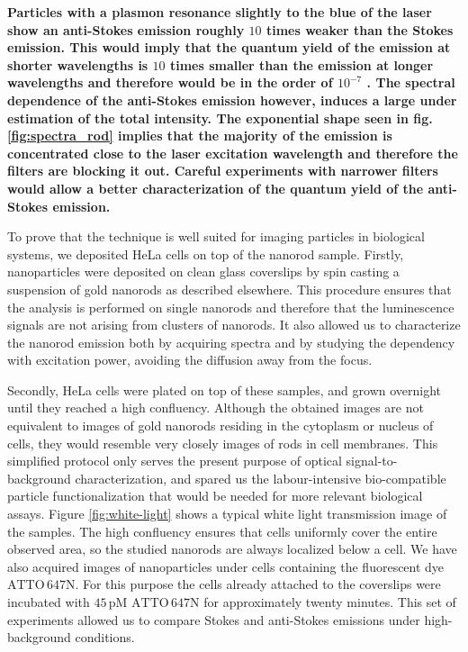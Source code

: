 \documentclass[journal=nalefd,manuscript=letter]{achemso}
\newcommand{\pM}{\ensuremath{\,\textrm{pM}}}
\newcommand{\atto}{\ensuremath{\textrm{ATTO}\,647\textrm{N}}}
\begin{document}
\textbf{Particles with a plasmon resonance slightly to the blue of the laser
show an anti-Stokes emission roughly $10$ times weaker than the Stokes emission.
This would imply that the quantum yield of the emission at shorter wavelengths
is $10$ times smaller than the emission at longer wavelengths and therefore
would be in the order of $10^{-7}$
\cite{Yorulmaz2012,Cheng2015,Rao2015,Fang2012}. The spectral dependence of the
anti-Stokes emission however, induces a large under estimation of the total
intensity. The exponential shape seen in fig. \ref{fig:spectra_rod} implies that
the majority of the emission is concentrated close to the laser excitation
wavelength and therefore the filters are blocking it out. Careful experiments
with narrower filters would allow a better characterization of the quantum
yield of the anti-Stokes emission.}

To prove that the technique is well suited for imaging particles in
biological systems, we deposited HeLa cells on top of the nanorod sample.
Firstly, nanoparticles were deposited on clean glass coverslips by spin casting
a suspension of gold nanorods as described elsewhere\cite{Zijlstra2011}. This
procedure ensures that the analysis is performed on single nanorods and
therefore that the luminescence signals are not arising from clusters of
nanorods. It also allowed us to characterize the nanorod emission both by
acquiring spectra and by studying the dependency with excitation power, avoiding
the diffusion away from the focus.

Secondly, HeLa cells were plated on top of these samples, and grown overnight
until they reached a high confluency. Although the obtained images are not
equivalent to images of gold nanorods residing in the cytoplasm or nucleus of
cells, they would resemble very closely images of rods in cell membranes. This
simplified protocol only serves the present purpose of optical
signal-to-background characterization, and spared us the labour-intensive
bio-compatible particle functionalization that would be needed for more relevant
biological assays. Figure \ref{fig:white-light} shows a typical white light
transmission image of the samples. The high confluency ensures that cells
uniformly cover the entire observed area, so the studied nanorods are always
localized below a cell. We have also acquired images of nanoparticles under
cells containing the fluorescent dye $\atto$. For this purpose the cells already
attached to the coverslips were incubated with $45\pM$ $\atto$ for approximately
twenty minutes. This set of experiments allowed us to compare Stokes and
anti-Stokes emissions under high-background conditions.
\end{document}
